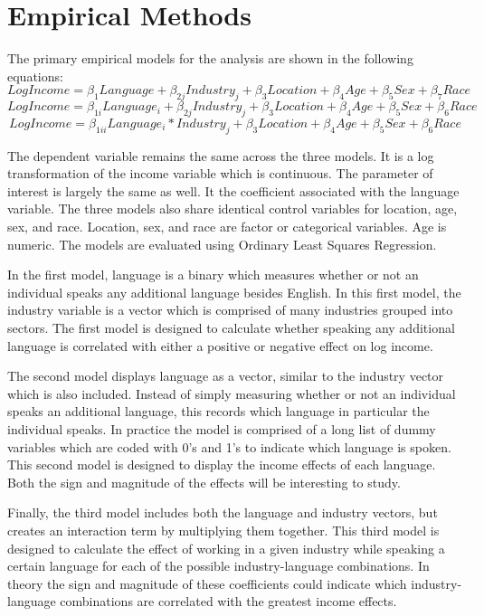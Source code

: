 \documentclass[12pt,english]{article}
\begin{document}
\section{Empirical Methods}\label{sec:methods}
The primary empirical models for the analysis are shown in the following equations:
\begin{equation}
      LogIncome=\beta_1 Language +\beta_{2j}Industry_{j}+\beta_3 Location+\beta_4 Age + \beta_5 Sex + \beta_7 Race
\end{equation}
\begin{equation}
    LogIncome=\beta_{1i}Language_{i}+\beta_{2j}Industry_{j}+\beta_3 Location+\beta_4 Age + \beta_5 Sex + \beta_6 Race
\end{equation}
\begin{equation}
  LogIncome=\beta_{1ii}Language_{i}*Industry_{j}+\beta_3 Location+\beta_4 Age + \beta_5 Sex + \beta_6 Race  
\end{equation}

The dependent variable remains the same across the three models. It is a log transformation of the income variable which is continuous. The parameter of interest is largely the same as well. It the coefficient associated with the language variable. The three models also share identical control variables for location, age, sex, and race. Location, sex, and race are factor or categorical variables. Age is numeric. The models are evaluated using Ordinary Least Squares Regression. 

In the first model, language is a binary which measures whether or not an individual speaks any additional language besides English. In this first model, the industry variable is a vector which is comprised of many industries grouped into sectors. The first model is designed to calculate whether speaking any additional language is correlated with either a positive or negative effect on log income. 

The second model displays language as a vector, similar to the industry vector which is also included. Instead of simply measuring whether or not an individual speaks an additional language, this records which language in particular the individual speaks. In practice the model is comprised of a long list of dummy variables which are coded with 0's and 1's to indicate which language is spoken. This second model is designed to display the income effects of each language. Both the sign and magnitude of the effects will be interesting to study. 

Finally, the third model includes both the language and industry vectors, but creates an interaction term by multiplying them together. This third model is designed to calculate the effect of working in a given industry while speaking a certain language for each of the possible industry-language combinations. In theory the sign and magnitude of these coefficients could indicate which industry-language combinations are correlated with the greatest income effects. 
\end{document}
